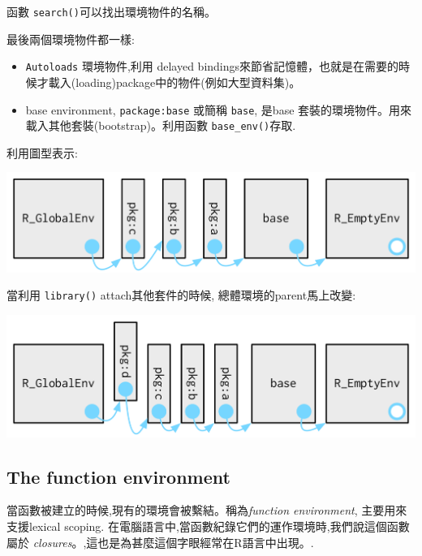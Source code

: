 \documentclass[]{book}
\theoremstyle{definition}
\theoremstyle{definition}
\theoremstyle{definition}
\theoremstyle{remark}
\begin{document}
函數 \texttt{search()}可以找出環境物件的名稱。

最後兩個環境物件都一樣:

\begin{itemize}
\item
  \texttt{Autoloads} 環境物件,利用 delayed
  bindings來節省記憶體，也就是在需要的時候才載入(loading)package中的物件(例如大型資料集)。
\item
  base environment, \texttt{package:base} 或簡稱 \texttt{base}, 是base
  套裝的環境物件。用來 載入其他套裝(bootstrap)。利用函數
  \texttt{base\_env()}存取.
\end{itemize}

利用圖型表示:

\begin{center}\includegraphics{diagrams/environments/search-path} \end{center}

當利用 \texttt{library()} attach其他套件的時候,
總體環境的parent馬上改變:

\begin{center}\includegraphics{diagrams/environments/search-path-2} \end{center}

\hypertarget{the-function-environment}{%
\subsection{The function environment}\label{the-function-environment}}

當函數被建立的時候,現有的環境會被繫結。稱為\emph{function environment},
主要用來支援lexical scoping.
在電腦語言中,當函數紀錄它們的運作環境時,我們說這個函數屬於
\emph{closures}。,這也是為甚麼這個字眼經常在R語言中出現。.
\end{document}
